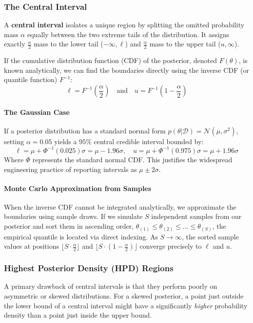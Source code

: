 \documentclass{article}
\begin{document}
\subsubsection{The Central Interval}
A \textbf{central interval} isolates a unique region by splitting the omitted probability mass $\alpha$ equally between the two extreme tails of the distribution. It assigns exactly $\frac{\alpha}{2}$ mass to the lower tail ($-\infty, \ell$) and $\frac{\alpha}{2}$ mass to the upper tail ($u, \infty$).

If the cumulative distribution function (CDF) of the posterior, denoted $F(\theta)$, is known analytically, we can find the boundaries directly using the inverse CDF (or quantile function) $F^{-1}$:
\begin{equation}
\ell = F^{-1}\left(\frac{\alpha}{2}\right) \quad \text{and} \quad u = F^{-1}\left(1 - \frac{\alpha}{2}\right)
\end{equation}

\paragraph{The Gaussian Case}
If a posterior distribution has a standard normal form $p(\theta|\mathcal{D}) = \mathcal{N}(\mu, \sigma^2)$, setting $\alpha = 0.05$ yields a $95\%$ central credible interval bounded by:
\begin{equation}
\ell = \mu + \Phi^{-1}(0.025)\sigma = \mu - 1.96\sigma, \quad u = \mu + \Phi^{-1}(0.975)\sigma = \mu + 1.96\sigma
\end{equation}
Where $\Phi$ represents the standard normal CDF. This justifies the widespread engineering practice of reporting intervals as $\mu \pm 2\sigma$.

\paragraph{Monte Carlo Approximation from Samples}
When the inverse CDF cannot be integrated analytically, we approximate the boundaries using sample draws. If we simulate $S$ independent samples from our posterior and sort them in ascending order, $\theta_{(1)} \le \theta_{(2)} \le \dots \le \theta_{(S)}$, the empirical quantile is located via direct indexing. As $S \to \infty$, the sorted sample values at positions $\lfloor S \cdot \frac{\alpha}{2} \rfloor$ and $\lfloor S \cdot (1 - \frac{\alpha}{2}) \rfloor$ converge precisely to $\ell$ and $u$.

\subsubsection{Highest Posterior Density (HPD) Regions}
A primary drawback of central intervals is that they perform poorly on asymmetric or skewed distributions. For a skewed posterior, a point just outside the lower bound of a central interval might have a significantly \textit{higher} probability density than a point just inside the upper bound. 
\end{document}
